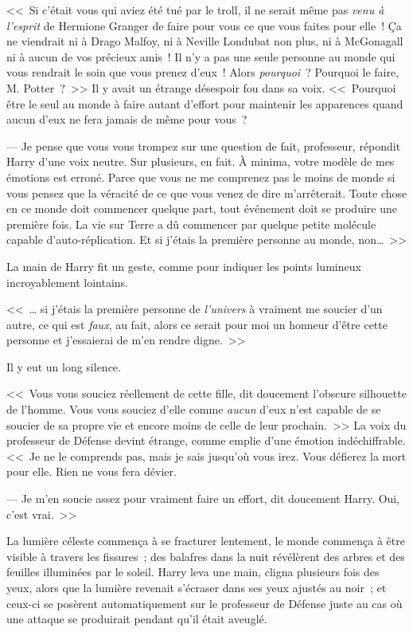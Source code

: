 <<~Si c'était vous qui aviez été tué par le troll, il ne serait même pas \emph{venu à l'esprit} de Hermione Granger de faire pour vous ce que vous faites pour elle~! Ça ne viendrait ni à Drago Malfoy, ni à Neville Londubat non plus, ni à McGonagall ni à aucun de vos précieux amis~! Il n'y a pas une seule personne au monde qui vous rendrait le soin que vous prenez d'eux~! Alors \emph{pourquoi}~? Pourquoi le faire, M. Potter~?~>> Il y avait un étrange désespoir fou dans sa voix. <<~Pourquoi être le seul au monde à faire autant d'effort pour maintenir les apparences quand aucun d'eux ne fera jamais de même pour vous~?

--- Je pense que vous vous trompez sur une question de fait, professeur, répondit Harry d'une voix neutre. Sur plusieurs, en fait. À minima, votre modèle de mes émotions est erroné. Parce que vous ne me comprenez pas le moins de monde si vous pensez que la véracité de ce que vous venez de dire m'arrêterait. Toute chose en ce monde doit commencer quelque part, tout événement doit se produire une première fois. La vie sur Terre a dû commencer par quelque petite molécule capable d'auto-réplication. Et si j'étais la première personne au monde, non…~>>

La main de Harry fit un geste, comme pour indiquer les points lumineux incroyablement lointains.

<<~… si j'étais la première personne de \emph{l'univers} à vraiment me soucier d'un autre, ce qui est \emph{faux}, au fait, alors ce serait pour moi un honneur d'être cette personne et j'essaierai de m'en rendre digne.~>>

Il y eut un long silence.

<<~Vous vous souciez réellement de cette fille, dit doucement l'obscure silhouette de l'homme. Vous vous souciez d'elle comme \emph{aucun} d'eux n'est capable de se soucier de sa propre vie et encore moins de celle de leur prochain.~>> La voix du professeur de Défense devint étrange, comme emplie d'une émotion indéchiffrable. <<~Je ne le comprends pas, mais je sais jusqu'où vous irez. Vous défierez la mort pour elle. Rien ne vous fera dévier.

--- Je m'en soucie assez pour vraiment faire un effort, dit doucement Harry. Oui, c'est vrai.~>>

La lumière céleste commença à se fracturer lentement, le monde commença à être visible à travers les fissures~; des balafres dans la nuit révélèrent des arbres et des feuilles illuminées par le soleil. Harry leva une main, cligna plusieurs fois des yeux, alors que la lumière revenait s'écraser dans ses yeux ajustés au noir~; et ceux-ci se posèrent automatiquement sur le professeur de Défense juste au cas où une attaque se produirait pendant qu'il était aveuglé.

